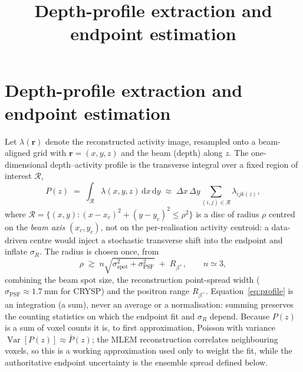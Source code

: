 \documentclass[11pt]{article}
\title{Depth-profile extraction and endpoint estimation}
\author{}
\date{\vspace{-3em}}
\begin{document}
\maketitle
\vspace{-2em}

\section{Depth-profile extraction and endpoint estimation}
\label{sec:depthprofile}

Let \(\lambda(\mathbf{r})\) denote the reconstructed activity image, resampled
onto a beam-aligned grid with \(\mathbf{r}=(x,y,z)\) and the beam (depth) along
\(z\). The one-dimensional depth--activity profile is the transverse integral
over a fixed region of interest \(\mathcal{R}\),
\begin{equation}
  P(z) \;=\; \int_{\mathcal{R}} \lambda(x,y,z)\,\mathrm{d}x\,\mathrm{d}y
        \;\approx\; \Delta x\,\Delta y \!\!\sum_{(i,j)\in\mathcal{R}}\!\!
        \lambda_{ijk(z)},
  \label{eq:profile}
\end{equation}
where \(\mathcal{R}=\{(x,y):(x-x_c)^2+(y-y_c)^2\le\rho^2\}\) is a disc of radius
\(\rho\) centred on the \emph{beam axis} \((x_c,y_c)\), not on the
per-realisation activity centroid: a data-driven centre would inject a stochastic
transverse shift into the endpoint and inflate \(\sigma_R\). The radius is chosen
once, from
\begin{equation}
  \rho \;\gtrsim\; n\sqrt{\sigma_{\mathrm{spot}}^{2}+\sigma_{\mathrm{PSF}}^{2}}
        \;+\; R_{\beta^{+}}, \qquad n\simeq 3,
  \label{eq:roi}
\end{equation}
combining the beam spot size, the reconstruction point-spread width
(\(\sigma_{\mathrm{PSF}}\approx\SI{1.7}{\milli\metre}\) for CRYSP) and the
positron range \(R_{\beta^{+}}\). Equation~\eqref{eq:profile} is an integration
(a sum), never an average or a normalisation: summing preserves the counting
statistics on which the endpoint fit and \(\sigma_R\) depend. Because
\(P(z)\) is a sum of voxel counts it is, to first approximation, Poisson with
variance \(\operatorname{Var}[P(z)]\approx\bar{P}(z)\); the MLEM reconstruction
correlates neighbouring voxels, so this is a working approximation used only to
weight the fit, while the authoritative endpoint uncertainty is the ensemble
spread defined below.
\end{document}
